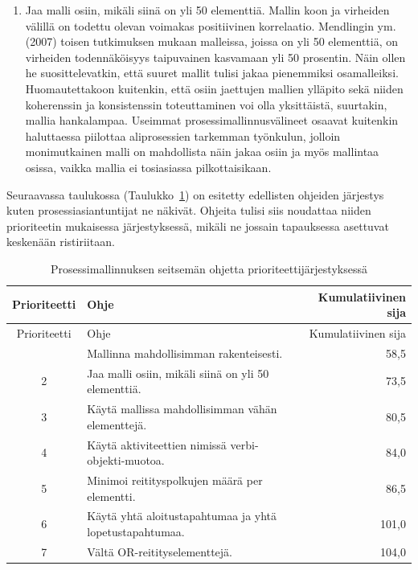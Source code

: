 \documentclass[
  finnish,
  letterpaper,
  DIV=11,
  numbers=noendperiod,
  oneside]{scrreprt}
\begin{document}
\begin{enumerate}
  aktiviteetit epämääräisemmin toiminnan kontekstilla (esimerkiksi
  ''Reklamaatio''). Mendling ym. (2010) ehdottavat verbi-objekti -muotoa
  parhaaksi käytänteeksi.
\item
  Jaa malli osiin, mikäli siinä on yli 50 elementtiä. Mallin koon ja
  virheiden välillä on todettu olevan voimakas positiivinen korrelaatio.
  Mendlingin ym. (2007) toisen tutkimuksen mukaan malleissa, joissa on
  yli 50 elementtiä, on virheiden todennäköisyys taipuvainen kasvamaan
  yli 50 prosentin. Näin ollen he suosittelevatkin, että suuret mallit
  tulisi jakaa pienemmiksi osamalleiksi. Huomautettakoon kuitenkin, että
  osiin jaettujen mallien ylläpito sekä niiden koherenssin ja
  konsistenssin toteuttaminen voi olla yksittäistä, suurtakin, mallia
  hankalampaa. Useimmat prosessimallinnusvälineet osaavat kuitenkin
  haluttaessa piilottaa aliprosessien tarkemman työnkulun, jolloin
  monimutkainen malli on mahdollista näin jakaa osiin ja myös mallintaa
  osissa, vaikka mallia ei tosiasiassa pilkottaisikaan.
\end{enumerate}

Seuraavassa taulukossa (Taulukko~\ref{tbl-7pmg}) on esitetty edellisten
ohjeiden järjestys kuten prosessiasiantuntijat ne näkivät. Ohjeita
tulisi siis noudattaa niiden prioriteetin mukaisessa järjestyksessä,
mikäli ne jossain tapauksessa asettuvat keskenään ristiriitaan.

\begin{longtable}[]{@{}clr@{}}
\caption{Prosessimallinnuksen seitsemän ohjetta
prioriteettijärjestyksessä}\label{tbl-7pmg}\tabularnewline
\toprule\noalign{}
Prioriteetti & Ohje & Kumulatiivinen sija \\
\midrule\noalign{}
\endfirsthead
\toprule\noalign{}
Prioriteetti & Ohje & Kumulatiivinen sija \\
\midrule\noalign{}
\endhead
\bottomrule\noalign{}
\endlastfoot
1 & Mallinna mahdollisimman rakenteisesti. & 58,5 \\
2 & Jaa malli osiin, mikäli siinä on yli 50 elementtiä. & 73,5 \\
3 & Käytä mallissa mahdollisimman vähän elementtejä. & 80,5 \\
4 & Käytä aktiviteettien nimissä verbi-objekti-muotoa. & 84,0 \\
5 & Minimoi reitityspolkujen määrä per elementti. & 86,5 \\
6 & Käytä yhtä aloitustapahtumaa ja yhtä lopetustapahtumaa. & 101,0 \\
7 & Vältä OR-reitityselementtejä. & 104,0 \\
\end{longtable}
\end{document}
